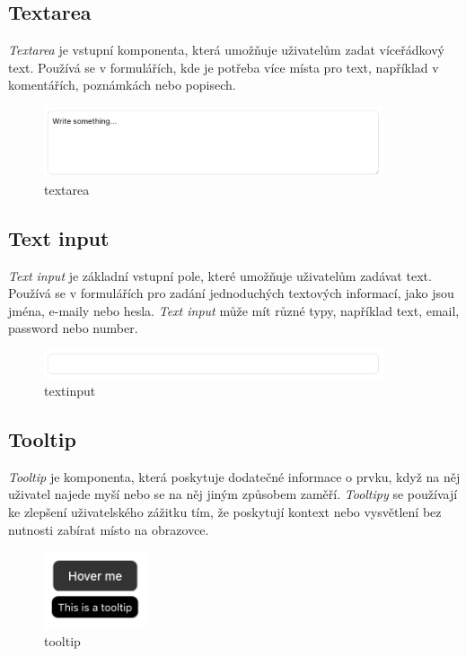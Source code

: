 \subsection{Textarea}
\emph{Textarea} je vstupní komponenta, která umožňuje uživatelům zadat víceřádkový text. Používá se v formulářích, kde je potřeba více místa pro text, například v komentářích, poznámkách nebo popisech.

\begin{figure}[H]
  \centering
  \includegraphics[width=10cm]{images/textarea}
  \captionsetup{justification=centering,margin=2cm}
  \caption{textarea} \label{picture:textarea}
\end{figure}

\subsection{Text input}
\emph{Text input} je základní vstupní pole, které umožňuje uživatelům zadávat text. Používá se v formulářích pro zadání jednoduchých textových informací, jako jsou jména, e-maily nebo hesla. \emph{Text input} může mít různé typy, například text, email, password nebo number.

\begin{figure}[H]
  \centering
  \includegraphics[width=10cm]{images/textinput}
  \captionsetup{justification=centering,margin=2cm}
  \caption{textinput} \label{picture:textinput}
\end{figure}

\subsection{Tooltip}
\emph{Tooltip} je komponenta, která poskytuje dodatečné informace o prvku, když na něj uživatel najede myší nebo se na něj jiným způsobem zaměří. \emph{Tooltipy} se používají ke zlepšení uživatelského zážitku tím, že poskytují kontext nebo vysvětlení bez nutnosti zabírat místo na obrazovce.

\begin{figure}[H]
  \centering
  \includegraphics[width=3cm]{images/tooltip}
  \captionsetup{justification=centering,margin=2cm}
  \caption{tooltip} \label{picture:tooltip}
\end{figure}

